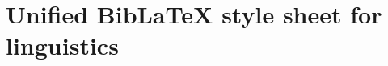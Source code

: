 \documentclass{article}
\begin{document}
\section*{Unified BibLaTeX style sheet for linguistics}
	
\nocite{*} 

\printbibliography[heading=none]
\end{document}
